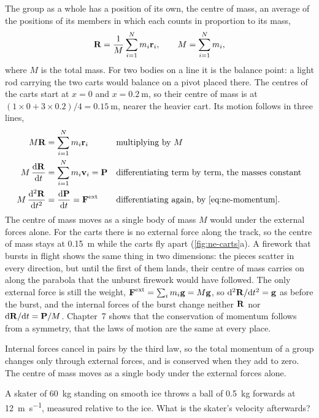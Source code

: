 The group as a whole has a position of its own, the centre of mass, an
average of the positions of its members in which each counts in
proportion to its mass,
\begin{equation*}
   \bm{\mathrm{R}} = \frac{1}{M}\sum_{i=1}^{N} m_i\bm{\mathrm{r}}_i, \qquad
   M = \sum_{i=1}^{N} m_i ,
\end{equation*}
where $M$ is the total mass. For two bodies on a line it is the balance
point: a light rod carrying the two carts would balance on a pivot placed
there. The centres of the carts start at $x = 0$ and $x =
\SI{0.2}{\metre}$, so their
centre of mass is at $(1\times0 + 3\times0.2)/4 = \SI{0.15}{\metre}$,
nearer the heavier cart. Its motion follows in three lines,
\begin{align*}
   M\vb{R} &= \sum_{i=1}^{N} m_i\vb{r}_i
      && \text{multiplying by $M$}\\
   M\,\frac{\dd\vb{R}}{\dd t} &= \sum_{i=1}^{N} m_i\vb{v}_i = \vb{P}
      && \text{differentiating term by term, the masses constant}\\
   M\,\frac{\dd^2\vb{R}}{\dd t^2} &= \frac{\dd\vb{P}}{\dd t}
      = \vb{F}^{\mathrm{ext}}
      && \text{differentiating again, by \cref{eq:ne-momentum}.}
\end{align*}
The centre of mass moves as a single body of mass $M$ would under the
external forces alone. For the carts there is no external force along the
track, so the centre of mass stays at \SI{0.15}{\metre} while the carts
fly apart (\cref{fig:ne-carts}a). A firework that bursts in flight shows
the same thing in two dimensions: the pieces scatter in every direction,
but until the first of them lands, their centre of mass carries on along
the parabola that the unburst firework would have followed. The only
external force is still the weight, $\bm{\mathrm{F}}^{\mathrm{ext}} = \sum_i
m_i\bm{\mathrm{g}} = M\bm{\mathrm{g}}$, so $\mathrm{d}^2\bm{\mathrm{R}}/\mathrm{d} t^2 = \bm{\mathrm{g}}$ as before the
burst, and the internal forces of the burst change neither $\bm{\mathrm{R}}$ nor
$\mathrm{d}\bm{\mathrm{R}}/\mathrm{d} t = \bm{\mathrm{P}}/M$. Chapter~7 shows that the
conservation of momentum follows from a symmetry, that the laws of motion
are the same at every place.

\begin{keyidea}
Internal forces cancel in pairs by the third law, so the total momentum
of a group changes only through external forces, and is conserved when
they add to zero. The centre of mass moves as a single body under the
external forces alone.
\end{keyidea}


\begin{selfcheck}
A skater of \SI{60}{\kilogram} standing on smooth ice throws a ball of
\SI{0.5}{\kilogram} forwards at \SI{12}{\metre\per\second}, measured
relative to the ice. What is the
skater's velocity afterwards?
\end{selfcheck}
